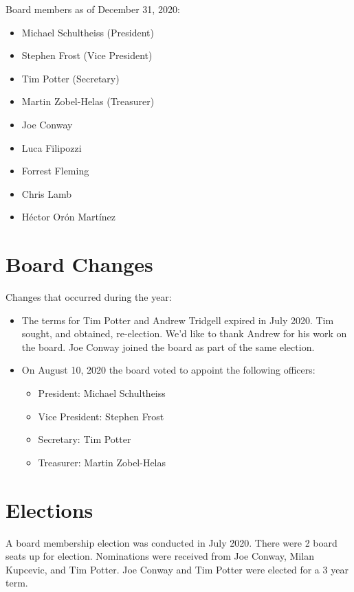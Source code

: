 \documentclass[a4paper]{report}
\begin{document}
Board members as of December 31, 2020:

\begin{itemize}
\item Michael Schultheiss (President)
\item Stephen Frost (Vice President)
\item Tim Potter (Secretary)
\item Martin Zobel-Helas (Treasurer)
\item Joe Conway
\item Luca Filipozzi
\item Forrest Fleming
\item Chris Lamb
\item Héctor Orón Martínez
\end{itemize}

\section{Board Changes}

Changes that occurred during the year:

\begin{itemize}

\item The terms for Tim Potter and Andrew Tridgell expired in July 2020.  Tim sought, and obtained, re-election.  We'd like to thank Andrew for his work on the board.  Joe Conway joined the board as part of the same election.

\item On August 10, 2020 the board voted to appoint the following officers:

\begin{itemize}
\item President: Michael Schultheiss
\item Vice President: Stephen Frost
\item Secretary: Tim Potter
\item Treasurer: Martin Zobel-Helas
\end{itemize}

\end{itemize}

\section{Elections}

A board membership election was conducted in July 2020.  There were 2 board seats up for election.  Nominations were received from Joe Conway, Milan Kupcevic, and Tim Potter.  Joe Conway and Tim Potter were elected for a 3 year term.
\end{document}
